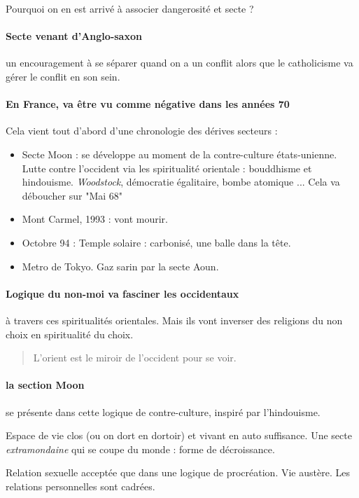  
\begin{Prop}
    Pourquoi on en est arrivé à associer dangerosité et secte ?
\end{Prop}

\paragraph{Secte venant d'Anglo-saxon} un encouragement à se séparer quand on a un conflit alors que le catholicisme va gérer le conflit en son sein.

\paragraph{En France, va être vu comme négative dans les années 70} Cela vient tout d'abord d'une chronologie des dérives secteurs : 
\begin{itemize}
    \item Secte Moon : se développe au moment de la contre-culture états-unienne. Lutte contre l'occident via les spiritualité orientale : bouddhisme et hindouisme. \textit{Woodstock}, démocratie égalitaire, bombe atomique ... Cela va déboucher sur "Mai 68"
    \item Mont Carmel, 1993 : vont mourir. 
    \item Octobre 94 : Temple solaire : carbonisé, une balle dans la tête.
    \item Metro de Tokyo. Gaz sarin par la secte Aoun.
\end{itemize}

\paragraph{Logique du non-moi va fasciner les occidentaux} à travers ces spiritualités orientales. Mais ils vont inverser des religions du non choix en spiritualité du choix. 
\begin{quote}
    L'orient est le miroir de l'occident pour se voir.
\end{quote}

\paragraph{la section Moon} se présente dans cette logique de contre-culture, inspiré par l'hindouisme. 
\begin{Def}[Ashram]
    Espace de vie clos (ou on dort en dortoir) et vivant en auto suffisance. Une secte \textit{extramondaine} qui se coupe du monde : forme de décroissance. 
  
\end{Def}
  Relation sexuelle acceptée que dans une logique de procréation. Vie austère.
    Les relations personnelles sont cadrées.

